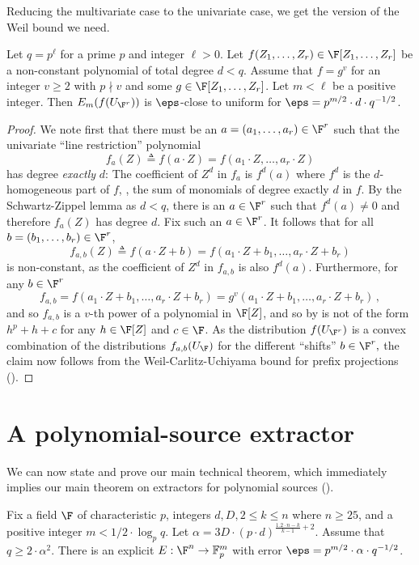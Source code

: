 Reducing the multivariate case to the univariate case, we get the version of the Weil bound we need.
\begin{lemma}\label{lem-multivariate_weil}
Let $q=p^{\ell}$ for a prime $p$ and integer $\ell>0$. Let $f(Z_1,\ldots,Z_r)\in \F[Z_1,\ldots,Z_r]$ be a
non-constant polynomial of total degree $d<q$.
Assume that $f= g^v$ for an integer $v\geq 2$ with
$p\nmid v$ and some $g\in \F[Z_1,\ldots,Z_r]$. Let $m<\ell $ be a positive integer.
Then $E_m(f(U_{\F^r}))$ is $\eps$-close to uniform for $\eps=p^{m/2}\cdot d\cdot q^{-1/2}$.
\end{lemma}
\begin{proof}
We note first that there must be an $a= (a_1,\ldots,a_r)\in \F^r$ such that the univariate ``line restriction'' polynomial
\[f_a(Z)\triangleq f(a\cdot Z ) = f(a_1\cdot Z,\ldots,a_r\cdot Z)\] has degree \emph{exactly} $d$: The coefficient
of $Z^d$ in $f_a$ is $f^d(a)$ where $f^d$ is the $d$-homogeneous part of $f$, \ie, the sum of monomials of degree
exactly $d$ in $f$. By the Schwartz-Zippel lemma as $d<q$, there is an $a\in \F^r$ such that $f^d(a)\neq 0$
and therefore $f_a(Z)$ has degree $d$.
Fix such an $a\in \F^r$.
It follows that for all $b = (b_1,\ldots,b_r) \in \F^r$,
\[f_{a,b}(Z)\triangleq
f(a\cdot Z+ b) = f(a_1\cdot Z + b_1,\ldots, a_r\cdot Z + b_r)\]
%
%
is non-constant, as the coefficient
%
of $Z^d$ in $f_{a,b}$ is also $f^d(a)$.
 Furthermore, for any $b\in \F^r$
\[f_{a,b}= f(a_1\cdot Z + b_1,\ldots, a_r\cdot Z + b_r)=
g^v(a_1\cdot Z + b_1,\ldots, a_r\cdot Z + b_r)\,,\]
and so $f_{a,b}$ is a
%
$v$-th
power of a polynomial in $\F[Z]$, and so
by  is not of the form $h^p + h + c$ for any $h\in \F[Z]$ and $c\in \F$.
As the distribution $f(U_{\F^r})$ is a convex combination of the distributions $f_{a,b}(U_{\F})$
for the different ``shifts'' $b\in\F^r,$ the claim now follows from the Weil-Carlitz-Uchiyama bound for prefix projections ().
\end{proof}


%
%
\section{A polynomial-source extractor}\label{sec:extractor}

We can now state and prove our main technical theorem, which immediately implies our main theorem on extractors for polynomial sources ().

\begin{theorem}\label{thm-ext_main}
Fix a field $\F$ of characteristic $p$, integers $d,D,2\leq k\leq n$ where $n\geq 25$,
and a positive integer $m<1/2\cdot \log_p q$.
Let $\alpha=3 D \cdot (p\cdot d)^{\frac{1.2\cdot n-k}{k-1} +2} $. Assume that   $q\geq 2\cdot  \alpha^2$.
There is an explicit   $E:\F^n\to \mathbb{F}_p^m$ with error
$\eps =  p^{m/2}\cdot \alpha \cdot q^{-1/2}$.
\end{theorem}

